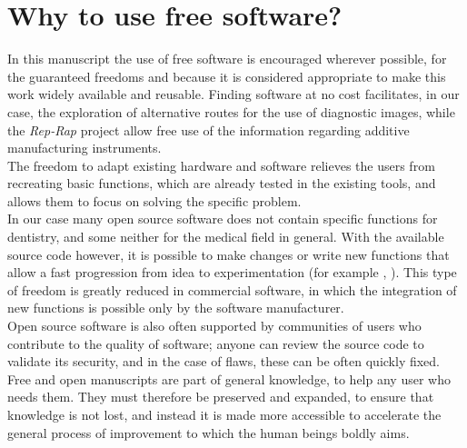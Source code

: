 \section{Why to use free software?}
In this manuscript the use of free software is encouraged wherever possible, for the guaranteed freedoms and because it is considered appropriate to make this work widely available and reusable. Finding software at no cost facilitates, in our case, the exploration of alternative routes for the use of diagnostic images, while the \emph{Rep-Rap} project \parencite{Reference62} allow free use of the information regarding additive manufacturing instruments. \\
The freedom to adapt existing hardware and software relieves the users from recreating basic functions, which are already tested in the existing tools, and allows them to focus on solving the specific problem.\\
In our case many open source software does not contain specific functions for dentistry, and some neither for the medical field in general. With the available source code however, it is possible to make changes or write new functions that allow a fast progression from idea to experimentation (for example \parencite{Reference63}, \parencite{Reference64}). This type of freedom is greatly reduced in commercial software, in which the integration of new functions is possible only by the software manufacturer. \\
Open source software is also often supported by communities of users who contribute to the quality of software; anyone can review the source code to validate its security, and in the case of flaws, these can be often quickly fixed.\\
Free and open manuscripts are part of general knowledge, to help any user who needs them. They must therefore be preserved and expanded, to ensure that knowledge is not lost, and instead it is made more accessible to accelerate the general process of improvement to which the human beings boldly aims.